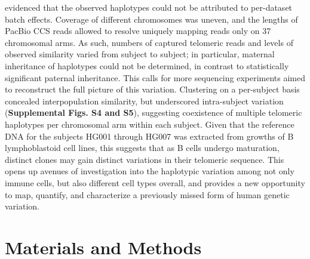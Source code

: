 \documentclass{article}
\begin{document}
        evidenced that the observed haplotypes could not be attributed to per-dataset batch effects.
    Coverage of different chromosomes was uneven,
        and the lengths of PacBio CCS reads allowed to resolve uniquely mapping reads only on 37 chromosomal arms.
        As such, numbers of captured telomeric reads and levels of observed similarity varied from subject to subject;
        in particular, maternal inheritance of haplotypes could not be determined, in contrast to statistically significant paternal inheritance.
        This calls for more sequencing experiments aimed to reconstruct the full picture of this variation.
    Clustering on a per-subject basis concealed interpopulation similarity,
        but underscored intra-subject variation (\textbf{Supplemental Figs. S4 and S5}),
            suggesting coexistence of multiple telomeric haplotypes per chromosomal arm within each subject.
        Given that the reference DNA for the subjects HG001 through HG007
            was extracted from growths of B lymphoblastoid cell lines,
            this suggests that as B cells undergo maturation,
                distinct clones may gain distinct variations in their telomeric sequence.
        This opens up avenues of investigation into the haplotypic variation among not only immune cells,
            but also different cell types overall,
            and provides a new opportunity to map, quantify, and characterize a previously missed form of human genetic variation.

\section*{Materials and Methods}  \label{sec:methods}
\end{document}
